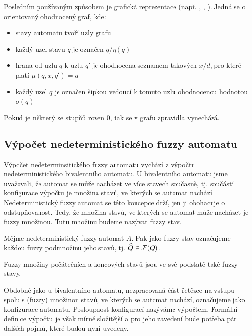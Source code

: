 \documentclass[a4paper,10pt]{article}
\begin{document}
Posledním používaným způsobem je grafická reprezentace (např. \cite{DooKre-NewDirFuzzAut}, \cite{GonGar-FuzzLangInfRanAccGuzzAutPumLemDetProc}, \cite{StaCir-ConsFuzzAutFuzzRegExp}). Jedná se o orientovaný ohodnocený graf, kde:
\begin{itemize}
 \item stavy automatu tvoří uzly grafu
 \item každý uzel stavu $q$ je označen $q/\eta(q)$
 \item hrana od uzlu $q$ k uzlu $q'$ je ohodnocena seznamem takových $x/d$, pro které platí $\mu(q, x, q') = d$
 \item každý uzel $q$ je označen šipkou vedoucí k tomuto uzlu ohodnocenou hodnotou $\sigma(q)$
\end{itemize}

Pokud je některý ze stupňů roven $0$, tak se v grafu zpravidla vynechává.

\begin{example}
\end{example}


\subsection{Výpočet nedeterministického fuzzy automatu}
Výpočet nedeterminsitického fuzzy automatu vychází z výpočtu nedeterministického bivalentního automatu. U bivalentního automatu jsme uvažovali, že automat se může nacházet ve více stavech současně, tj. součástí konfigurace výpočtu je množina stavů, ve kterých se automat nachází. Nedeterministický fuzzy automat se této koncepce drží, jen ji obohacuje o odstupňovanost. Tedy, že množina stavů, ve kterých se automat může nacházet je fuzzy množinou. Tutu množinu budeme nazývat fuzzy stav.

\begin{definition}\label{def-FuzzStav}
 Mějme nedeterministický fuzzy automat $A$. Pak jako fuzzy stav označujeme každou fuzzy podmnožinu jeho stavů, tj. $\widehat{Q} \in \mathcal{F}(Q)$.
\end{definition}

\begin{note}
 Fuzzy množiny počátečních a koncových stavů jsou ve své podstatě také fuzzy stavy.
\end{note}

Obdobně jako u bivalentního automatu, nezpracovaná část řetězce na vstupu spolu s (fuzzy) množinou stavů, ve kterých se automat nachází, označujeme jako konfigurace automatu. Posloupnost konfigurací nazýváme výpočtem. Formální definice výpočtu je však mírně složitější a pro jeho zavedení bude potřeba pár dalších pojmů, které budou nyní uvedeny.
\end{document}
